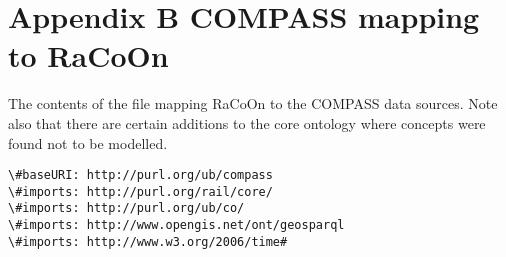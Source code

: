 
\chapter{Appendix B COMPASS mapping to RaCoOn}
\label{app:mapping}

 The contents of the file mapping RaCoOn to the COMPASS data sources. Note also that there are certain additions to the core ontology where concepts were found not to be modelled. 
 \begin{frame}[fragile]
\begin{lstlisting}[float=b,language=sparql,frame=tb,caption={Mapping of RaCoOn to COMPASS project data},label=lst:racooncompassmap]
\#baseURI: http://purl.org/ub/compass
\#imports: http://purl.org/rail/core/
\#imports: http://purl.org/ub/co/
\#imports: http://www.opengis.net/ont/geosparql
\#imports: http://www.w3.org/2006/time#




\end{lstlisting}
\end{frame}
